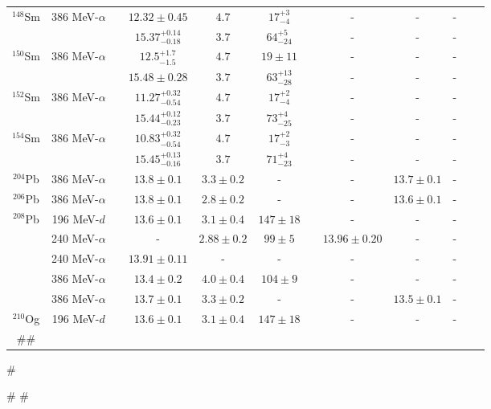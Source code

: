 \begin{table}[t!]
{\begin{tabular}{@{}cccccccccc@{}cc}
$^{148}$Sm & 386 MeV-$\alpha$ & & $12.32\pm0.45$& $4.7$ & ${17}^{+3}_{-4}$ & & - & - & - & & \cite{Itoh_prc2003} \\
  & & & ${15.37}^{+0.14}_{-0.18}$ & $3.7$ & ${64}^{+5}_{-24}$ & & - & - & - & & \cite{Itoh_prc2003} \\
$^{150}$Sm & 386 MeV-$\alpha$ & & ${12.5}^{+1.7}_{-1.5}$& $4.7$ & $19\pm11$ & & - & - & - & & \cite{Itoh_prc2003} \\
  & & & $15.48 \pm 0.28$ & $3.7$ & ${63}^{+13}_{-28}$ & & - & - & - & & \cite{Itoh_prc2003} \\
$^{152}$Sm & 386 MeV-$\alpha$ & & ${11.27}^{+0.32}_{-0.54}$ & $4.7$ & ${17}^{+2}_{-4}$ & & - & - & - & & \cite{Itoh_prc2003} \\
  & & & ${15.44}^{+0.12}_{-0.23}$ & $3.7$ & ${73}^{+4}_{-25}$ & & - & - & - & & \cite{Itoh_prc2003} \\
$^{154}$Sm & 386 MeV-$\alpha$ & & ${10.83}^{+0.32}_{-0.54}$& $4.7$ & ${17}^{+2}_{-3}$ & & - & - & - & & \cite{Itoh_prc2003} \\
  & & & ${15.45}^{+0.13}_{-0.16}$ & $3.7$ & ${71}^{+4}_{-23}$ & & - & - & - & & \cite{Itoh_prc2003} \\
$^{204}$Pb & 386 MeV-$\alpha$ & & $13.8\pm0.1$ & $3.3\pm0.2$ & - & & - & $13.7\pm0.1$ & - & & \cite{Darshana2013} \\
$^{206}$Pb & 386 MeV-$\alpha$ & & $13.8\pm0.1$ & $2.8\pm0.2$ & - & & - & $13.6\pm0.1$ & - & &  \cite{Darshana2013} \\
$^{208}$Pb & 196 MeV-$d$ & & $13.6\pm0.1$ & $3.1\pm0.4$ & $147\pm18$ & & - & - & - & & \cite{Darshana2015} \\
  & 240 MeV-$\alpha$ & & - & $2.88\pm0.2$ & $99\pm 5$ & & $13.96\pm 0.20$ & - & - & & \cite{dhybg} \\
  & 240 MeV-$\alpha$ & & $13.91\pm0.11$ & - & - & & - & - & - & & \cite{dhyprl} \\
  & 386 MeV-$\alpha$ & & $13.4\pm0.2$ & $4.0\pm0.4$ & $104\pm9$ & & - & - & - & & \cite{Uchida_90Zr} \\
  & 386 MeV-$\alpha$ & & $13.7\pm0.1$ & $3.3\pm0.2$ & - & & - & $13.5\pm0.1$ & - & & \cite{Darshana2013} \\
$^{210}$Og & 196 MeV-$d$ & & $13.6\pm0.1$ & $3.1\pm0.4$ & $147\pm18$ & & - & - & - & & \cite{Darshana2015} \\
#\bottomrule[0.1ex]
#\end{tabular}
#}
#\label{ISGMR-table}
#\end{table}